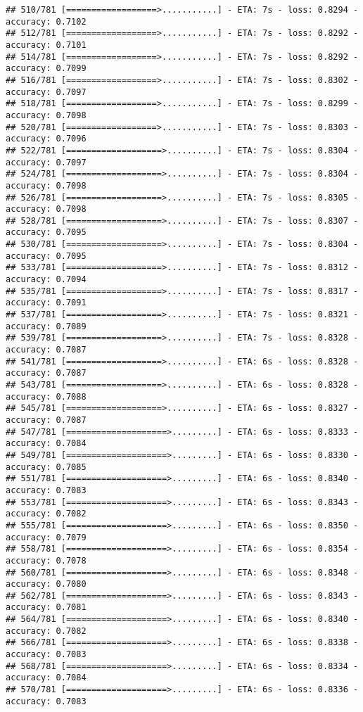 \documentclass[
]{article}
\begin{document}
\begin{verbatim}
## 510/781 [==================>...........] - ETA: 7s - loss: 0.8294 - accuracy: 0.7102
## 512/781 [==================>...........] - ETA: 7s - loss: 0.8292 - accuracy: 0.7101
## 514/781 [==================>...........] - ETA: 7s - loss: 0.8292 - accuracy: 0.7099
## 516/781 [==================>...........] - ETA: 7s - loss: 0.8302 - accuracy: 0.7097
## 518/781 [==================>...........] - ETA: 7s - loss: 0.8299 - accuracy: 0.7098
## 520/781 [==================>...........] - ETA: 7s - loss: 0.8303 - accuracy: 0.7096
## 522/781 [===================>..........] - ETA: 7s - loss: 0.8304 - accuracy: 0.7097
## 524/781 [===================>..........] - ETA: 7s - loss: 0.8304 - accuracy: 0.7098
## 526/781 [===================>..........] - ETA: 7s - loss: 0.8305 - accuracy: 0.7098
## 528/781 [===================>..........] - ETA: 7s - loss: 0.8307 - accuracy: 0.7095
## 530/781 [===================>..........] - ETA: 7s - loss: 0.8304 - accuracy: 0.7095
## 533/781 [===================>..........] - ETA: 7s - loss: 0.8312 - accuracy: 0.7094
## 535/781 [===================>..........] - ETA: 7s - loss: 0.8317 - accuracy: 0.7091
## 537/781 [===================>..........] - ETA: 7s - loss: 0.8321 - accuracy: 0.7089
## 539/781 [===================>..........] - ETA: 7s - loss: 0.8328 - accuracy: 0.7087
## 541/781 [===================>..........] - ETA: 6s - loss: 0.8328 - accuracy: 0.7087
## 543/781 [===================>..........] - ETA: 6s - loss: 0.8328 - accuracy: 0.7088
## 545/781 [===================>..........] - ETA: 6s - loss: 0.8327 - accuracy: 0.7087
## 547/781 [====================>.........] - ETA: 6s - loss: 0.8333 - accuracy: 0.7084
## 549/781 [====================>.........] - ETA: 6s - loss: 0.8330 - accuracy: 0.7085
## 551/781 [====================>.........] - ETA: 6s - loss: 0.8340 - accuracy: 0.7083
## 553/781 [====================>.........] - ETA: 6s - loss: 0.8343 - accuracy: 0.7082
## 555/781 [====================>.........] - ETA: 6s - loss: 0.8350 - accuracy: 0.7079
## 558/781 [====================>.........] - ETA: 6s - loss: 0.8354 - accuracy: 0.7078
## 560/781 [====================>.........] - ETA: 6s - loss: 0.8348 - accuracy: 0.7080
## 562/781 [====================>.........] - ETA: 6s - loss: 0.8343 - accuracy: 0.7081
## 564/781 [====================>.........] - ETA: 6s - loss: 0.8340 - accuracy: 0.7082
## 566/781 [====================>.........] - ETA: 6s - loss: 0.8338 - accuracy: 0.7083
## 568/781 [====================>.........] - ETA: 6s - loss: 0.8334 - accuracy: 0.7084
## 570/781 [====================>.........] - ETA: 6s - loss: 0.8336 - accuracy: 0.7083

\end{verbatim}
\end{document}
